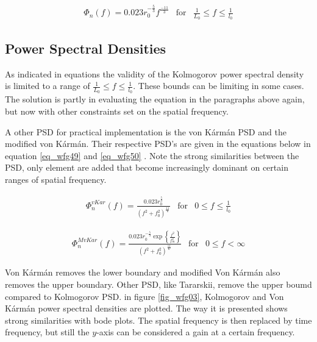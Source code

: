 \documentclass{article}
\begin{document}
\begin{equation}
\begin{matrix}
\Phi_n(f) = 0.023 r_0^{-\frac{5}{3}} f^{\frac{-11}{3}} & \text{for} & \frac{1}{L_0} \leq f \leq \frac{1}{l_0}
\end{matrix}
\label{eq_wfg48}
\end{equation}

\newpage
\subsection{Power Spectral Densities}
As indicated in equations the validity of the Kolmogorov power spectral density is limited to a range of $\frac{1}{L_0} \leq f \leq \frac{1}{l_0}$. These bounds can be limiting in some cases. The solution is partly in evaluating the equation in the paragraphs above again, but now with other constraints set on the spatial frequency.

A other PSD for practical implementation is the von K{\'a}rm{\'a}n PSD and the modified von K{\'a}rm{\'a}n. Their respective PSD's are given in the equations below in equation \ref{eq_wfg49} and \ref{eq_wfg50} \cite{zernikeCircle}. Note the strong similarities between the PSD, only element are added that become increasingly dominant on certain ranges of spatial frequency.

\begin{equation}
\begin{matrix}
\Phi_n^{vKar}(f) = \frac{0.023 r_0^{\frac{5}{3}}}{\left(f^{2} + f_{0}^{2}\right)^{\frac{11}{6}}} & \text{for} & 0 \leq f \leq \frac{1}{l_0}
\end{matrix}
\label{eq_wfg49}
\end{equation}

\begin{equation}
\begin{matrix}
\Phi_n^{MvKar}(f) = \frac{0.023 r_0^{-\frac{5}{3}} \exp\left\{\frac{f^2}{f_m^2}\right\} } {(f^2 + f_0^2)^{\frac{11}{6}}}  & \text{for} & 0 \leq f < \infty
\end{matrix} 
\label{eq_wfg50}
\end{equation}

Von K{\'a}rm{\'a}n removes the lower boundary and modified Von K{\'a}rm{\'a}n also removes the upper boundary. Other PSD, like Tararskii, remove the upper boumd compared to Kolmogorov PSD. in figure \ref{fig_wfg03}, Kolmogorov and Von K{\'a}rm{\'a}n power spectral densities are plotted. The way it is presented shows strong similarities with bode plots. The spatial frequency is then replaced by time frequency, but still the $y$-axis can be considered a gain at a certain frequency.
 
\end{document}
